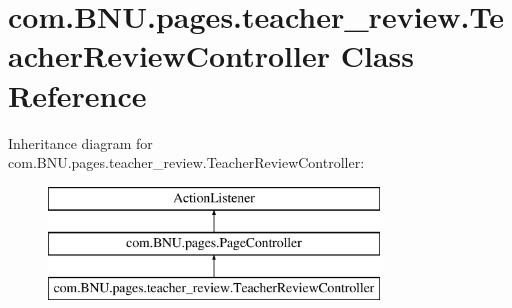 \hypertarget{classcom_1_1_b_n_u_1_1pages_1_1teacher__review_1_1_teacher_review_controller}{}\section{com.\+B\+N\+U.\+pages.\+teacher\+\_\+review.\+Teacher\+Review\+Controller Class Reference}
\label{classcom_1_1_b_n_u_1_1pages_1_1teacher__review_1_1_teacher_review_controller}
Inheritance diagram for com.\+B\+N\+U.\+pages.\+teacher\+\_\+review.\+Teacher\+Review\+Controller\+:\begin{figure}[H]
\begin{center}
\leavevmode
\includegraphics[height=3.000000cm]{classcom_1_1_b_n_u_1_1pages_1_1teacher__review_1_1_teacher_review_controller}
\end{center}
\end{figure}
